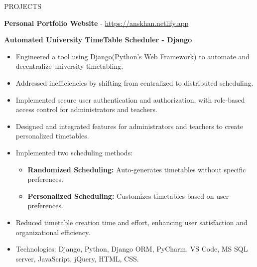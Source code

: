 \documentclass{resume} %
\begin{document}
\begin{rSection}{PROJECTS}
\vspace{-1.25em}
\item \textbf{Personal Portfolio Website}  - \href{https://anskhan.netlify.app}{https://anskhan.netlify.app}
\item \textbf{Automated University TimeTable Scheduler - Django}

\iffalse


 {Built a tool to easify the hectic and stressfull process of organization timetabling. Problem needed to solve was to make the process distributed instead of the current centralised timetable scheduling process. Keeping provided features for admin and teachers to solve the problem and create personalized timetables. Implemented two ways to get the final scheduled timetable, i.e. Randomised and personalized timetables}
 
\fi
 
 \begin{itemize}
 	\item Engineered a tool using Django(Python's Web Framework) to automate and decentralize university timetabling.
 	\item Addressed inefficiencies by shifting from centralized to distributed scheduling.
 	\item Implemented secure user authentication and authorization, with role-based access control for administrators and teachers.
 	\item Designed and integrated features for administrators and teachers to create personalized timetables.
 	\item Implemented two scheduling methods:
 	\begin{itemize}
 		\item \textbf{Randomized Scheduling:} Auto-generates timetables without specific preferences.
 		\item \textbf{Personalized Scheduling:} Customizes timetables based on user preferences.
 	\end{itemize}
 	\item Reduced timetable creation time and effort, enhancing user satisfaction and organizational efficiency.
 	\item Technologies: Django, Python, Django ORM, PyCharm, VS Code, MS SQL server, JavaScript, jQuery, HTML, CSS.
 \end{itemize}
 

\end{rSection}
\end{document}
